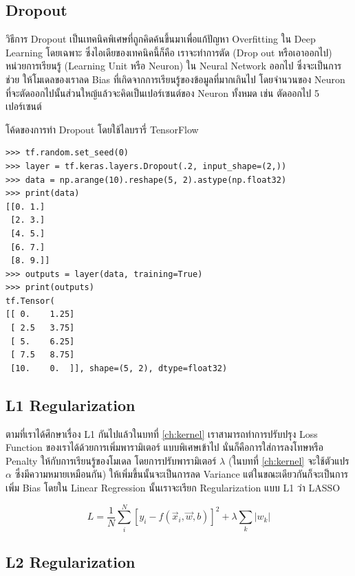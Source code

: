 \subsection{Dropout}
\label{ssec:dropout}

วิธีการ Dropout เป็นเทคนิคพิเศษที่ถูกคิดค้นขึ้นมาเพื่อแก้ปัญหา Overfitting ใน Deep Learning โดยเฉพาะ ซึ่งไอเดียของเทคนิคนี้ก็คือ%
เราจะทำการตัด (Drop out หรือเอาออกไป) หน่วยการเรียนรู้ (Learning Unit หรือ Neuron) ใน Neural Network ออกไป ซึ่งจะเป็นการช่วย%
ให้โมเดลของเราลด Bias ที่เกิดจากการเรียนรู้ของข้อมูลที่มากเกินไป โดยจำนวนของ Neuron ที่จะตัดออกไปนั้นส่วนใหญ้แล้วจะคิดเป็นเปอร์เซนต์ของ
Neuron ทั้งหมด เช่น ตัดออกไป 5 เปอร์เซนต์

โค้ดของการทำ Dropout โดยใช้ไลบรารี่ TensorFlow

\begin{lstlisting}[style=MyPython]
>>> tf.random.set_seed(0)
>>> layer = tf.keras.layers.Dropout(.2, input_shape=(2,))
>>> data = np.arange(10).reshape(5, 2).astype(np.float32)
>>> print(data)
[[0. 1.]
 [2. 3.]
 [4. 5.]
 [6. 7.]
 [8. 9.]]
>>> outputs = layer(data, training=True)
>>> print(outputs)
tf.Tensor(
[[ 0.    1.25]
 [ 2.5   3.75]
 [ 5.    6.25]
 [ 7.5   8.75]
 [10.    0.  ]], shape=(5, 2), dtype=float32)
\end{lstlisting}

\subsection{L1 Regularization}
\label{ssec:l1_reg}

ตามที่เราได้ศึกษาเรื่อง L1 กันไปแล้วในบทที่ \ref{ch:kernel} เราสามารถทำการปรับปรุง Loss Function ของเราได้ด้วยการเพิ่มพารามิเตอร์%
แบบพิเศษเข้าไป นั่นก็คือการใส่การลงโทษหรือ Penalty ให้กับการเรียนรู้ของโมเดล โดยการปรับพารามิเตอร์ $\lambda$ (ในบทที่ \ref{ch:kernel}
จะใช้ตัวแปร $\alpha$ ซึ่งมีความหมายเหมือนกัน) ให้เพิ่มขึ้นนั้นจะเป็นการลด Variance แต่ในขณะเดียวกันก็จะเป็นการเพิ่ม Bias โดยใน 
Linear Regression นั้นเราจะเรียก Regularization แบบ L1 ว่า LASSO

\begin{equation}
    L = \frac{1}{N}\sum_i^N \left[y_i - \hat{f}(\vec{x}_i, \vec{w}, b)\right]^2 + \lambda \sum_k \left|w_k\right|
\end{equation}

\subsection{L2 Regularization}
\label{ssec:l2_reg}

